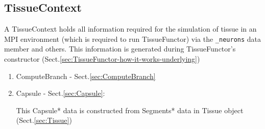 \subsection{TissueContext}
\label{sec:TissueContext}

A TissueContext holds all information required for the simulation of tissue in
an MPI environment (which is required to run TissueFunctor) via the
\verb!_neurons! data member and others. This information is generated during
TissueFunctor's constructor
(Sect.\ref{sec:TissueFunctor-how-it-works-underlying})
\begin{enumerate}
  \item ComputeBranch - Sect.\ref{sec:ComputeBranch}
  \item Capsule - Sect.\ref{sec:Capsule}:
  
  This Capsule* data is constructed from Segments* data in Tissue object
  (Sect.\ref{sec:Tissue})
\end{enumerate}
